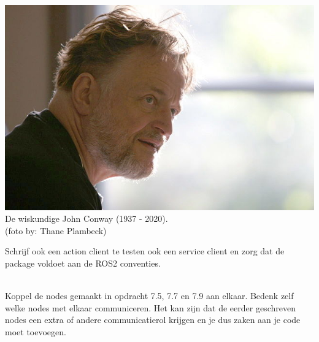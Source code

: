 \begin{exercise}
\begin{minipage}{0.6\textwidth}
\end{minipage}\hfill 
\begin{minipage}{0.3\textwidth}
\begin{center}
\includegraphics[width=\textwidth]{Pictures/640px-John_H_Conway_2005.jpg}\\
De wiskundige John Conway (1937 - 2020).\\{\tiny(foto by: Thane Plambeck)}\\
\end{center}
\end{minipage}


\vspace{1cm}
\noindent Schrijf ook een action client te testen ook een service client en zorg dat de package voldoet aan de ROS2 conventies. \\

\end{exercise}

\begin{exercise}[Pijpleiding]\mbox{}\\
Koppel de nodes gemaakt in opdracht 7.5, 7.7 en 7.9 aan elkaar. Bedenk zelf welke nodes met elkaar communiceren. Het kan zijn dat de eerder geschreven nodes een extra of andere communicatierol krijgen en je dus zaken aan je code moet toevoegen.
\end{exercise}